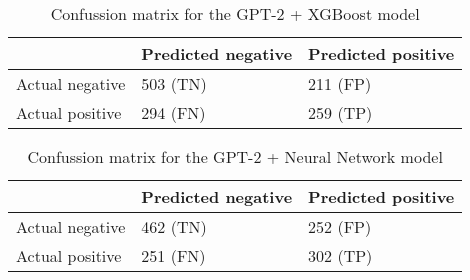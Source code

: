 \begin{table}[H]
\centering
{
\makegapedcells
\begin{tabular}{lll}
                & Predicted negative & Predicted positive \\
\hline
Actual negative & 503 (TN)           & 211 (FP) \\
Actual positive & 294 (FN)           & 259 (TP) \\
\hline
\end{tabular}
}
\caption{Confussion matrix for the GPT-2 + XGBoost model}
\label{gpt2xgb_cm}
\end{table}

\begin{table}[H]
\centering
{
\makegapedcells
\begin{tabular}{lll}
                & Predicted negative & Predicted positive \\
\hline
Actual negative & 462 (TN)           & 252 (FP) \\
Actual positive & 251 (FN)           & 302 (TP) \\
\hline
\end{tabular}
}
\caption{Confussion matrix for the GPT-2 + Neural Network model}
\label{gpt2nn_cm}
\end{table}